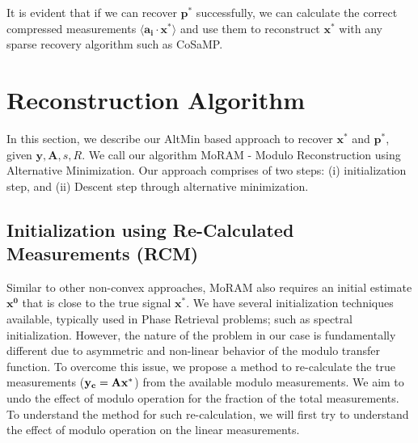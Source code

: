It is evident that if we can recover $\mathbf{p^*}$ successfully, we can calculate the correct compressed measurements $\langle \mathbf{a_i} \cdot \mathbf{x^*} \rangle$ and use them to reconstruct $\mathbf{x^*}$ with any sparse recovery algorithm such as CoSaMP.


\section{Reconstruction Algorithm}

In this section, we describe our AltMin based approach to recover $\mathbf{x^*}$ and $\mathbf{p^*}$, given $\mathbf{y, A}, s, R$. We call our algorithm MoRAM - Modulo Reconstruction using Alternative Minimization. Our approach comprises of two steps: (i) initialization step, and (ii) Descent step through alternative minimization.

\subsection{Initialization using Re-Calculated Measurements (RCM)}
Similar to other non-convex approaches, MoRAM also requires an initial estimate $\mathbf{{x}^0}$ that is close to the true signal $\mathbf{{x}^*}$. We have several initialization techniques available, typically used in Phase Retrieval problems; such as spectral initialization. However, the nature of the problem in our case is fundamentally different due to asymmetric and non-linear behavior of the modulo transfer function. To overcome this issue, we propose a method to re-calculate the true measurements ($\mathbf{y_c}= \mathbf{Ax^*}$) from the available modulo measurements. We aim to undo the effect of modulo operation for the fraction of the total measurements. To understand the method for such re-calculation, we will first try to understand the effect of modulo operation on the linear measurements.

